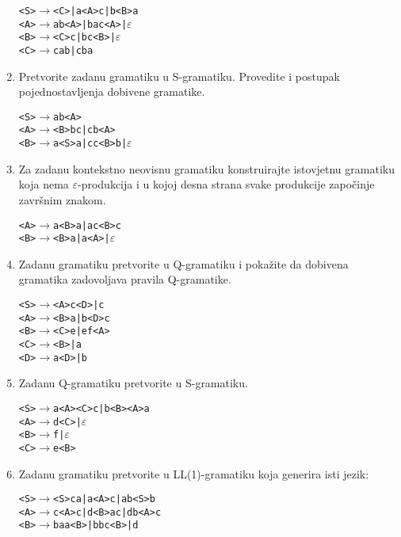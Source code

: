 \documentclass[times, 12pt, utf8]{book}
\begin{document}
\begin{enumerate}[resume]
\begin{alltt}
<S> \(\to\) <C> | a<A>c | b<B>a
<A> \(\to\) ab<A> | bac<A> | \(\varepsilon\)
<B> \(\to\) <C>c | bc<B> | \(\varepsilon\)
<C> \(\to\) cab | cba
\end{alltt} 

\item
Pretvorite zadanu gramatiku u S-gramatiku.
Provedite i postupak pojednostavljenja dobivene gramatike. \cite[str.~85]{udzbenik} \cite{auditorne}

\begin{alltt}
<S> \(\to\) ab<A>
<A> \(\to\) <B>bc | cb<A>
<B> \(\to\) a<S>a | cc<B>b | \(\varepsilon\)
\end{alltt} 

\item
Za zadanu kontekstno neovisnu gramatiku konstruirajte istovjetnu gramatiku koja nema \(\varepsilon\)-produkcija i u kojoj desna strana svake produkcije započinje završnim znakom. \cite[str.~85]{udzbenik} \cite{auditorne}

\begin{alltt}
<A> \(\to\) a<B>a | ac<B>c
<B> \(\to\) <B>a | a<A> | \(\varepsilon\)
\end{alltt} 

\item
Zadanu gramatiku pretvorite u Q-gramatiku i pokažite da dobivena gramatika zadovoljava pravila Q-gramatike. \cite[str.~91-95]{udzbenik}

\begin{alltt}
<S> \(\to\) <A>c<D> | c
<A> \(\to\) <B>a | b<D>c
<B> \(\to\) <C>e | ef<A>
<C> \(\to\) <B> | a
<D> \(\to\) a<D> | b
\end{alltt} 

\item
Zadanu Q-gramatiku pretvorite u S-gramatiku. \cite[str.~85-95]{udzbenik}

\begin{alltt}
<S> \(\to\) a<A><C>c | b<B><A>a
<A> \(\to\) d<C> | \(\varepsilon\)
<B> \(\to\) f | \(\varepsilon\)
<C> \(\to\) e<B>
\end{alltt} 

\item
Zadanu gramatiku pretvorite u LL(1)-gramatiku koja generira isti jezik: \cite[str.~107-111]{udzbenik}

\begin{alltt}
<S> \(\to\) <S>ca | a<A>c | ab<S>b
<A> \(\to\) c<A>c | d<B>ac | db<A>c
<B> \(\to\) baa<B> | bbc<B> | d
\end{alltt} 


\end{enumerate}
\end{document}
